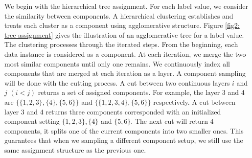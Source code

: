 We begin with the hierarchical tree assignment. For each label value, we consider the similarity between components. A hierarchical clustering establishes and treats each cluster as a component using agglomerative structure. Figure \ref{fig2: tree assignment} gives the illustration of an agglomerative tree for a label value. The clustering processes through the iterated steps. From the beginning, each data instance is considered as a component. At each iteration, we merge the two most similar components until only one remains. We continuously index all components that are merged at each iteration as a layer. A component sampling will be done with the cutting process. A cut between two continuous layers $i$ and $j$ $(i < j)$ returns a set of assigned components. For example, the layer 3 and 4 are $\{\{1,2,3\},\{4\},\{5,6\}\}$ and $\{\{1,2,3, 4\},\{5,6\}\}$ respectively. A cut between layer 3 and 4 returns three components corresponded with an initialized component setting $\{1,2,3\}, \{4\}$ and $\{5,6\}$. The next cut will return 4 components, it splits one of the current components into two smaller ones. This guarantees that when we sampling a different component setup, we still use the same assignment structure as the previous one.
